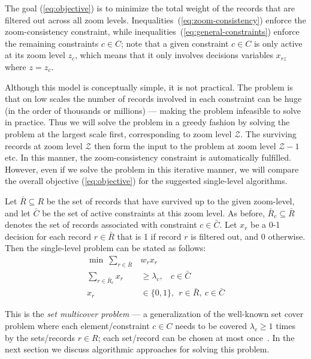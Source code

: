 The goal (\ref{eq:objective}) is to minimize the total weight of the records that are filtered out across all zoom levels. Inequalities~(\ref{eq:zoom-consistency}) enforce the zoom-consistency constraint, while inequalities~(\ref{eq:general-constraints}) enforce the remaining constraints $c \in C$; note that a given constraint $c \in C$ is only active at its zoom level $z_c$, which means that it only involves decisions variables $x_{rz}$ where $z = z_c$.

Although this model is conceptually simple, it is not practical. The problem is that on low scales the number of records involved in each constraint can be huge (in the order of thousands or millions) --- making the problem infeasible to solve in practice. Thus we will solve the problem in a greedy fashion by solving the problem at the largest scale first, corresponding to zoom level $\mathcal{Z}$. The surviving records at zoom level $\mathcal{Z}$ then form the input to the problem at zoom level $\mathcal{Z}-1$ etc. In this manner, the zoom-consistency constraint is automatically fulfilled. However, even if we solve the problem in this iterative manner, we will compare the overall objective (\ref{eq:objective}) for the suggested single-level algorithms. 

Let $\bar{R} \subseteq R$ be the set of records that have survived up to the given zoom-level, and let $\bar{C}$ be the set of active constraints at this zoom level. As before, $\bar{R}_c \subseteq \bar{R}$ denotes the set of records associated with constraint $c \in \bar{C}$. Let $x_r$ be a 0-1 decision for each record $r \in \bar{R}$ that is 1 if record $r$ is filtered out, and 0 otherwise. Then the single-level problem can be stated as follows:
\begin{align}
  \label{eq:objective-single}
  \min ~\sum_{r \in \bar{R}} &w_r x_r \\
  \label{eq:general-constraints-single}
  \sum_{r \in \bar{R}_c} x_r &\geq \lambda_c, ~~~~ c \in \bar{C} \\
  x_r & \in \{0, 1\}, ~~ r \in \bar{R}, ~c \in \bar{C}
\end{align}

This is the \emph{set multicover problem} --- a generalization of the well-known set cover problem where each element/constraint $c \in C$ needs to be covered $\lambda_c \geq 1$ times by the sets/records $r \in R$; each set/record can be chosen at most once~\cite{RajogopalanVazirani98}. In the next section we discuss algorithmic approaches for solving this problem.
